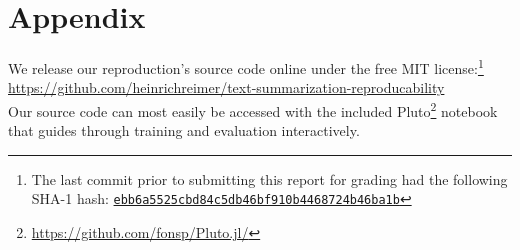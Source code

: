 \appendix
\section{Appendix} %

We release our reproduction's source code online under the free MIT license:\footnote{The last commit prior to submitting this report for grading had the following SHA-1 hash: \href{https://github.com/heinrichreimer/text-summarization-reproducability/commit/ebb6a5525cbd84c5db46bf910b4468724b46ba1b}{\texttt{ebb6a5525cbd84c5db46bf910b4468724b46ba1b}}}\\
\url{https://github.com/heinrichreimer/text-summarization-reproducability}\\
Our source code can most easily be accessed with the included Pluto\footnote{\url{https://github.com/fonsp/Pluto.jl/}} notebook that guides through training and evaluation interactively.
